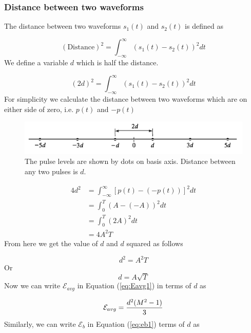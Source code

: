 \documentclass[a4paper]{article}
\numberwithin{equation}{subsection}
\begin{document}
	\subsubsection{Distance between two waveforms}
	The distance between two waveforms $s_1(t)$ and $s_2(t)$ is defined as
	
	\begin{equation}\label{key}
	(\text{Distance})^2=\int_{-\infty}^\infty ( s_1(t)-s_2(t))^2 dt
	\end{equation}
	We define a variable $d$ which is half the distance.
	
	\begin{equation}\label{key}
	(2d)^2=\int_{-\infty}^\infty ( s_1(t)-s_2(t))^2 dt
	\end{equation}
	For simplicity we calculate the distance between two waveforms which are on either side of zero, i.e. $p(t)$ and $-p(t)$
	
	\begin{figure}
		\centering
		\includegraphics[width=5in]{../figures/fig8_41}
		\caption{The pulse levels are shown by dots on basis axis. Distance between any two pulses is $d$.}
		\label{fig:fig8_41}
	\end{figure}
	
	
	\begin{equation}\label{key}
	\begin{aligned}
	4d^2 
	&=\int_{-\infty}^\infty [ p(t)-(-p(t)) ]^2 dt\\
	&=\int_0^T (A-(-A) )^2 dt \\
	&=\int_0^T (2A )^2 dt \\
	&=4A^2 T
	\end{aligned}
	\end{equation}
	From here we get the value of $d$ and $d$ squared as follows
	
	\begin{equation}\label{eq:d2}
	d^2 = A^2 T
	\end{equation}
	Or
	\begin{equation}\label{eq:d}
	d=A\sqrt{T}
	\end{equation}
	Now we can write $\mathcal{E}_{avg}$ in Equation (\ref{eq:Eavg1}) in terms of $d$ as 
	
	\begin{equation}\label{eq:eavg}
	\mathcal{E}_{avg}=\frac{d^2 (M^2-1)}{3} \\
	\end{equation}
	Similarly, we can write $\mathcal{E}_{b}$ in Equation (\ref{eq:eb1}) terms of $d$ as 
	
\end{document}
